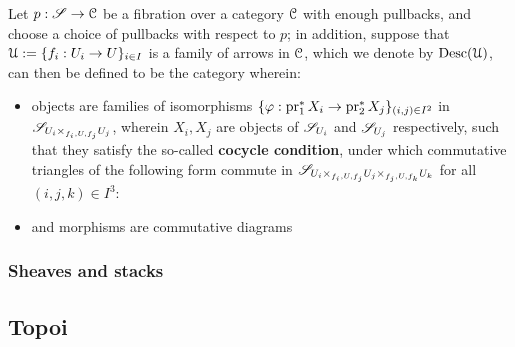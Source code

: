             \begin{definition} \label{def: descent_data}
                Let $p: \mathscr{S} \to \mathcal{C}$ be a fibration over a category $\mathcal{C}$ with enough pullbacks, and choose a choice of pullbacks with respect to $p$; in addition, suppose that $\mathcal{U} := \{f_i: U_i \to U\}_{i \in I}$ is a family of arrows in $\mathcal{C}$, which we denote by $\mathrm{Desc}(\mathcal{U})$, can then be defined to be the category wherein:
                    \begin{itemize}
                        \item objects are families of isomorphisms $\{\varphi: \operatorname{pr}_1^*X_i \to \operatorname{pr}_2^*X_j\}_{(i, j) \in I^2}$ in $\scrS_{U_i \x_{f_i, U, f_j} U_j}$, wherein $X_i, X_j$ are objects of $\mathscr{S}_{U_i}$ and $\mathscr{S}_{U_j}$ respectively, such that they satisfy the so-called \textbf{cocycle condition}, under which commutative triangles of the following form commute in $\scrS_{U_i \x_{f_i, U, f_j} U_j \x_{f_j, U, f_k} U_k}$ for all $(i, j, k) \in I^3$:
                        \item and morphisms are commutative diagrams 
                    \end{itemize}
            \end{definition}
            
        \subsubsection{Sheaves and stacks}
    
    \subsection{Topoi}